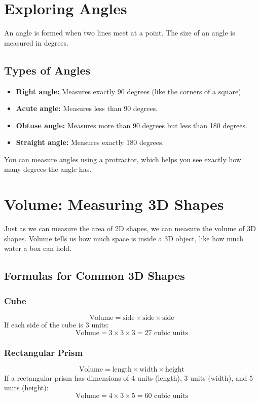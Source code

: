 \section{Exploring Angles}
An angle is formed when two lines meet at a point. The size of an angle is measured in degrees.

\subsection{Types of Angles}
\begin{itemize}
    \item \textbf{Right angle:} Measures exactly 90 degrees (like the corners of a square).
    \item \textbf{Acute angle:} Measures less than 90 degrees.
    \item \textbf{Obtuse angle:} Measures more than 90 degrees but less than 180 degrees.
    \item \textbf{Straight angle:} Measures exactly 180 degrees.
\end{itemize}

You can measure angles using a protractor, which helps you see exactly how many degrees the angle has.

\section{Volume: Measuring 3D Shapes}
Just as we can measure the area of 2D shapes, we can measure the volume of 3D shapes. Volume tells us how much space is inside a 3D object, like how much water a box can hold.

\subsection{Formulas for Common 3D Shapes}
\subsubsection{Cube}
\[
\text{Volume} = \text{side} \times \text{side} \times \text{side}
\]
If each side of the cube is 3 units:
\[
\text{Volume} = 3 \times 3 \times 3 = 27 \text{ cubic units}
\]

\subsubsection{Rectangular Prism}
\[
\text{Volume} = \text{length} \times \text{width} \times \text{height}
\]
If a rectangular prism has dimensions of 4 units (length), 3 units (width), and 5 units (height):
\[
\text{Volume} = 4 \times 3 \times 5 = 60 \text{ cubic units}
\]

